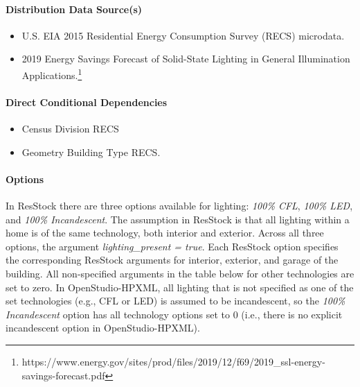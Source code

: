 \paragraph{Distribution Data Source(s)}\label{source-107}

\begin{itemize}
 
\item
  U.S. EIA 2015 Residential Energy Consumption Survey (RECS) microdata.
\item
  2019 Energy Savings Forecast of Solid-State Lighting in General
  Illumination Applications.\footnote{https://www.energy.gov/sites/prod/files/2019/12/f69/2019\_ssl-energy-savings-forecast.pdf}
\end{itemize}

\paragraph{Direct Conditional Dependencies}
\begin{itemize}
    \item{Census Division RECS}
    \item{Geometry Building Type RECS}.
\end{itemize}



\paragraph{Options}\label{options-108}
In ResStock there are three options available for lighting: \textit{100\% CFL}, \textit{100\% LED}, and \textit{100\% Incandescent}. The assumption in ResStock is that all lighting within a home is of the same technology, both interior and exterior. Across all three options, the argument \textit{lighting\_present = true}. Each ResStock option specifies the corresponding ResStock arguments for interior, exterior, and garage of the building. All non-specified arguments in the table below for other technologies are set to zero. In OpenStudio-HPXML, all lighting that is not specified as one of the set technologies (e.g., CFL or LED) is assumed to be incandescent, so the \textit{100\% Incandescent} option has all technology options set to 0 (i.e., there is no explicit incandescent option in OpenStudio-HPXML). 

